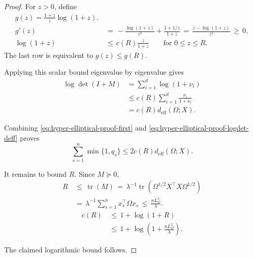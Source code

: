 \documentclass{article} %
\begin{document}
\begin{proof}
For \(z>0\), define
\begin{equation}
\label{eq:hyper-elliptical-proof-scalar}
\begin{aligned}
g(z)=
\frac{1+z}{z}\log(1+z).
\\
g'(z)
&\,=\,
-\frac{\log(1+z)}{z^2}+\frac{1+1/z}{1+z}
\,=\,
\frac{z-\log(1+z)}{z^2}
\,\geq\,
0,
\\
\log(1+z)
&\,\leq\,
c(R)\frac{z}{1+z}
\qquad
\text{for \(0\leq z\leq R\)}.
\end{aligned}
\end{equation}
The last row is equivalent to \(g(z)\leq g(R)\).

Applying this scalar bound eigenvalue by eigenvalue gives
\begin{equation}
\label{eq:hyper-elliptical-proof-logdet-deff}
\begin{aligned}
\log\det(I+M)
&=
\sum_{i=1}^{d}\log(1+\nu_i)
\\
&\le
c(R)\sum_{i=1}^{d}\frac{\nu_i}{1+\nu_i}
\\
&=
c(R)d_{\mathrm{eff}}(\Omega;X).
\end{aligned}
\end{equation}

Combining \eqref{eq:hyper-elliptical-proof-first} and \eqref{eq:hyper-elliptical-proof-logdet-deff} proves
\begin{equation}
\label{eq:hyper-elliptical-proof-main}
\sum_{s=1}^{n}\min\{1,q_s\}
\le
2c(R)d_{\mathrm{eff}}(\Omega;X).
\end{equation}

It remains to bound \(R\).  Since \(M\succeq 0\),
\begin{equation}
\label{eq:hyper-elliptical-proof-R}
\begin{aligned}
R
&\,\leq\,
\operatorname{tr}(M)
\,=\,
\lambda^{-1}
\operatorname{tr}\!\left(\Omega^{1/2}X^\top X\Omega^{1/2}\right)
\\
&\,=\,
\lambda^{-1}
\sum_{s=1}^{n}
x_s^\top\Omega x_s
\,\leq\,
\frac{nL_{\Omega}^2}{\lambda}.
\end{aligned}
\end{equation}
\begin{equation}
\label{eq:hyper-elliptical-proof-logT}
\begin{aligned}
c(R)
&\,\leq\,
1+\log(1+R)
\\
&\,\leq\,
1+\log\!\left(1+\frac{nL_{\Omega}^2}{\lambda}\right).
\end{aligned}
\end{equation}

The claimed logarithmic bound follows.
\end{proof}
\end{document}

